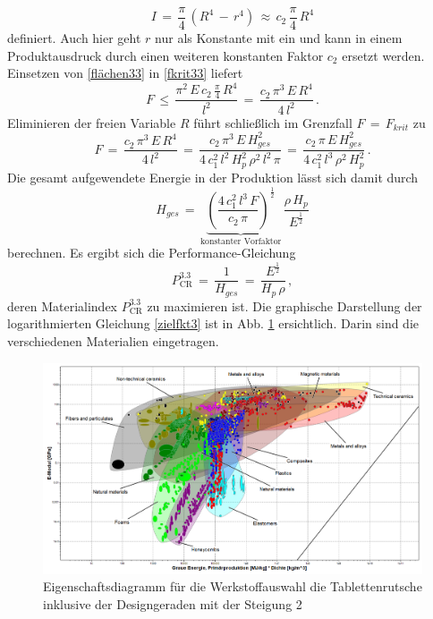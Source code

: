 \begin{equation}\label{flächen33}
I\,=\,\frac{\pi}{4}\,\left(R^4\,-\,r^4\right)\,\approx\,c_2\,\frac{\pi}{4}\,R^4
\end{equation}
definiert. Auch hier geht $r$ nur als Konstante mit ein und kann in einem Produktausdruck durch einen weiteren konstanten Faktor $c_2$ ersetzt werden. Einsetzen von \ref{flächen33} in \ref{fkrit33} liefert
\begin{equation}
F\,\le\,\frac{\pi^2\,E\,c_2\,\frac{\pi}{4}\,R^4}{l^2}\,=\,\frac{c_2\,\pi^3\,E\,R^4}{4\,l^2}\,.
\end{equation}
Eliminieren der freien Variable $R$ führt schließlich im Grenzfall $F\,=\,F_{krit}$ zu
\begin{equation}
F\,=\,\frac{c_2\,\pi^3\,E\,R^4}{4\,l^2}\,=\,\frac{c_2\,\pi^3\,E\,H_{ges}^2}{4\,c_1^2\,l^2\,H_p^2\,\rho^2\,l^2\,\pi}\,=\,\frac{c_2\,\pi\,E\,H_{ges}^2}{4\,c_1^2\,l^3\,\rho^2\,H_p^2}\,.
\end{equation}
Die gesamt aufgewendete Energie in der Produktion lässt sich damit durch
\begin{equation}
H_{ges}\,=\,\underbrace{\left(\frac{4\,c_1^2\,l^3\,F}{c_2\,\pi}\right)^\frac{1}{2}}_{\text{konstanter Vorfaktor}}\,\frac{\rho\,H_p}{E^\frac{1}{2}}
\end{equation}
berechnen.
Es ergibt sich die Performance-Gleichung
\begin{equation} \label{zielfkt3}
P_{\text{CR}}^{3.3}\,=\,\frac{1}{H_{ges}}\,=\,\frac{E^\frac{1}{2}}{H_p\,\rho}\,,
\end{equation}
deren Materialindex $P_{\text{CR}}^{3.3}$ zu maximieren ist. Die graphische Darstellung der logarithmierten Gleichung \ref{zielfkt3} ist in Abb. \ref{fig:ces_3_3_1} ersichtlich. Darin sind die verschiedenen Materialien eingetragen.\\
\begin{figure}[H]
	\centering
	\includegraphics[width=1.0\linewidth]{chapter/Bilder/3_3_1}
	\caption{Eigenschaftsdiagramm für die Werkstoffauswahl die Tablettenrutsche inklusive der Designgeraden mit der Steigung 2}
	\label{fig:ces_3_3_1}
\end{figure}
